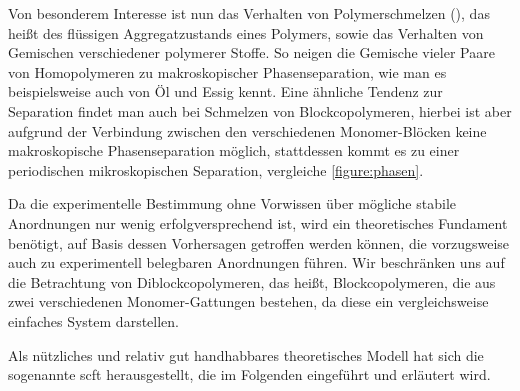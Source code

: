 \documentclass[../main.tex]{subfiles}
\begin{document}
Von besonderem Interesse ist nun das Verhalten von Polymerschmelzen (), das heißt des flüssigen Aggregatzustands eines Polymers, sowie das Verhalten von Gemischen verschiedener polymerer Stoffe.
So neigen die Gemische vieler Paare von Homopolymeren zu makroskopischer Phasenseparation, wie man es beispielsweise auch von Öl und Essig kennt.
Eine ähnliche Tendenz zur Separation findet man auch bei Schmelzen von Blockcopolymeren, hierbei ist aber aufgrund der Verbindung zwischen den verschiedenen Monomer-Blöcken keine makroskopische Phasenseparation möglich, stattdessen kommt es zu einer periodischen mikroskopischen Separation, vergleiche \cref{figure:phasen}.

Da die experimentelle Bestimmung ohne Vorwissen über mögliche stabile Anordnungen nur wenig erfolgversprechend ist, wird ein theoretisches Fundament benötigt, auf Basis dessen Vorhersagen getroffen werden können, die vorzugsweise auch zu experimentell belegbaren Anordnungen führen.
Wir beschränken uns auf die Betrachtung von Diblockcopolymeren, das heißt, Blockcopolymeren, die aus zwei verschiedenen Monomer-Gattungen bestehen, da diese ein vergleichsweise einfaches System darstellen.

Als nützliches und relativ gut handhabbares theoretisches Modell hat sich die sogenannte \ac{scft} herausgestellt, die im Folgenden eingeführt und erläutert wird.
\end{document}
